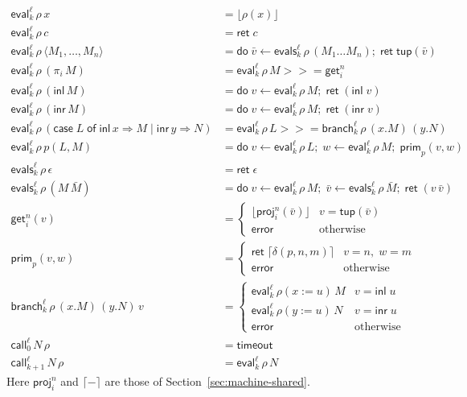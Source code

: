\documentclass[10pt]{article}
\theoremstyle{acmplain}
\newcommand{\key}[1]{\mathsf{#1}}
\newcommand{\inl}{\key{inl}\,}
\newcommand{\inr}{\key{inr}\,}
\newcommand{\Case}[5]{\key{case}\;#1\;\key{of}\;\key{inl}\,#2 \Rightarrow #3 \mid \key{inr}\,#4 \Rightarrow #5}
\newcommand{\tuple}[1]{\langle #1 \rangle}
\newcommand{\prj}[1]{\pi_{#1}\,}
\newcommand{\prim}[3]{#1(#2, #3)}
\newcommand{\res}[1]{\lceil #1 \rceil}
\newcommand{\ext}[3]{#1(#2{:=}#3)}
\newcommand{\error}{\key{error}}
\newcommand{\tupV}[1]{\key{tup}(#1)}
\newcommand{\inlV}{\key{inl}\;}
\newcommand{\inrV}{\key{inr}\;}
\newcommand{\tmo}{\key{timeout}}
\newcommand{\Ret}{\key{ret}\;}
\newcommand{\bind}{\mathbin{>\!\!>\!\!=}}
\newcommand{\Do}{\key{do}\;}
\newcommand{\lift}[1]{\lfloor #1 \rfloor}
\newcommand{\EV}[2]{\key{eval}^{#1}_{#2}}
\newcommand{\EVS}[2]{\key{evals}^{#1}_{#2}}
\newcommand{\CALL}[2]{\key{call}^{#1}_{#2}}
\newcommand{\BR}[2]{\key{branch}^{#1}_{#2}}
\begin{document}
\begin{align*}
  \EV{\ell}{k}\,\rho\,x &= \lift{\rho(x)} \\
  \EV{\ell}{k}\,\rho\,c &= \Ret c \\
  \EV{\ell}{k}\,\rho\,\tuple{M_1, \ldots, M_n} &=
    \Do \bar{v} \leftarrow \EVS{\ell}{k}\,\rho\,(M_1 \ldots M_n);\; \Ret \tupV{\bar{v}} \\
  \EV{\ell}{k}\,\rho\,(\prj{i} M) &= \EV{\ell}{k}\,\rho\,M \bind \key{get}^n_i \\
  \EV{\ell}{k}\,\rho\,(\inl M) &= \Do v \leftarrow \EV{\ell}{k}\,\rho\,M;\; \Ret (\inlV v) \\
  \EV{\ell}{k}\,\rho\,(\inr M) &= \Do v \leftarrow \EV{\ell}{k}\,\rho\,M;\; \Ret (\inrV v) \\
  \EV{\ell}{k}\,\rho\,(\Case{L}{x}{M}{y}{N}) &=
    \EV{\ell}{k}\,\rho\,L \bind \BR{\ell}{k}\,\rho\,(x.M)\,(y.N) \\
  \EV{\ell}{k}\,\rho\,\prim{p}{L}{M} &=
    \Do v \leftarrow \EV{\ell}{k}\,\rho\,L;\; w \leftarrow \EV{\ell}{k}\,\rho\,M;\; \key{prim}_p(v, w) \\[1ex]
  \EVS{\ell}{k}\,\rho\,\epsilon &= \Ret \epsilon \\
  \EVS{\ell}{k}\,\rho\,(M\,\bar{M}) &=
    \Do v \leftarrow \EV{\ell}{k}\,\rho\,M;\; \bar{v} \leftarrow \EVS{\ell}{k}\,\rho\,\bar{M};\; \Ret (v\,\bar{v}) \\[1ex]
  \key{get}^n_i(v) &=
    \begin{cases} \lift{\key{proj}^n_i(\bar{v})} & v = \tupV{\bar{v}} \\ \error & \text{otherwise} \end{cases} \\
  \key{prim}_p(v, w) &=
    \begin{cases} \Ret \res{\delta(p, n, m)} & v = n,\; w = m \\ \error & \text{otherwise} \end{cases} \\
  \BR{\ell}{k}\,\rho\,(x.M)\,(y.N)\,v &=
    \begin{cases}
      \EV{\ell}{k}\,\ext{\rho}{x}{u}\,M & v = \inlV u \\
      \EV{\ell}{k}\,\ext{\rho}{y}{u}\,N & v = \inrV u \\
      \error & \text{otherwise}
    \end{cases} \\[1ex]
  \CALL{\ell}{0}\,N\,\rho &= \tmo \\
  \CALL{\ell}{k+1}\,N\,\rho &= \EV{\ell}{k}\,\rho\,N
\end{align*}
Here $\key{proj}^n_i$ and $\res{-}$ are those of Section~\ref{sec:machine-shared}.
\end{document}
